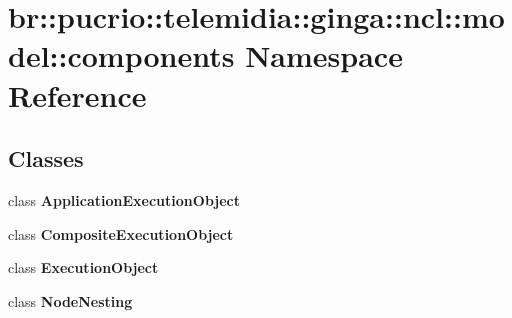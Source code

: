 \section{br::pucrio::telemidia::ginga::ncl::model::components Namespace Reference}
\label{namespacebr_1_1pucrio_1_1telemidia_1_1ginga_1_1ncl_1_1model_1_1components}


\subsection*{Classes}
\begin{CompactItemize}
\item 
class {\bf ApplicationExecutionObject}
\item 
class {\bf CompositeExecutionObject}
\item 
class {\bf ExecutionObject}
\item 
class {\bf NodeNesting}
\end{CompactItemize}
